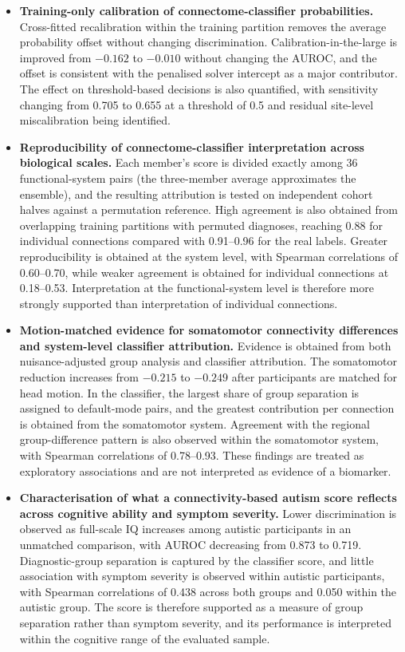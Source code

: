 \begin{itemize}

\item \textbf{Training-only calibration of connectome-classifier probabilities.} Cross-fitted recalibration within the training partition removes the average probability offset without changing discrimination. Calibration-in-the-large is improved from $-0.162$ to $-0.010$ without changing the AUROC, and the offset is consistent with the penalised solver intercept as a major contributor. The effect on threshold-based decisions is also quantified, with sensitivity changing from 0.705 to 0.655 at a threshold of 0.5 and residual site-level miscalibration being identified.

\item \textbf{Reproducibility of connectome-classifier interpretation across biological scales.} Each member's score is divided exactly among 36 functional-system pairs (the three-member average approximates the ensemble), and the resulting attribution is tested on independent cohort halves against a permutation reference. High agreement is also obtained from overlapping training partitions with permuted diagnoses, reaching 0.88 for individual connections compared with 0.91--0.96 for the real labels. Greater reproducibility is obtained at the system level, with Spearman correlations of 0.60--0.70, while weaker agreement is obtained for individual connections at 0.18--0.53. Interpretation at the functional-system level is therefore more strongly supported than interpretation of individual connections.

\item \textbf{Motion-matched evidence for somatomotor connectivity differences and system-level classifier attribution.} Evidence is obtained from both nuisance-adjusted group analysis and classifier attribution. The somatomotor reduction increases from $-0.215$ to $-0.249$ after participants are matched for head motion. In the classifier, the largest share of group separation is assigned to default-mode pairs, and the greatest contribution per connection is obtained from the somatomotor system. Agreement with the regional group-difference pattern is also observed within the somatomotor system, with Spearman correlations of 0.78--0.93. These findings are treated as exploratory associations and are not interpreted as evidence of a biomarker.

\item \textbf{Characterisation of what a connectivity-based autism score reflects across cognitive ability and symptom severity.} Lower discrimination is observed as full-scale IQ increases among autistic participants in an unmatched comparison, with AUROC decreasing from 0.873 to 0.719. Diagnostic-group separation is captured by the classifier score, and little association with symptom severity is observed within autistic participants, with Spearman correlations of 0.438 across both groups and 0.050 within the autistic group. The score is therefore supported as a measure of group separation rather than symptom severity, and its performance is interpreted within the cognitive range of the evaluated sample.


\end{itemize}
